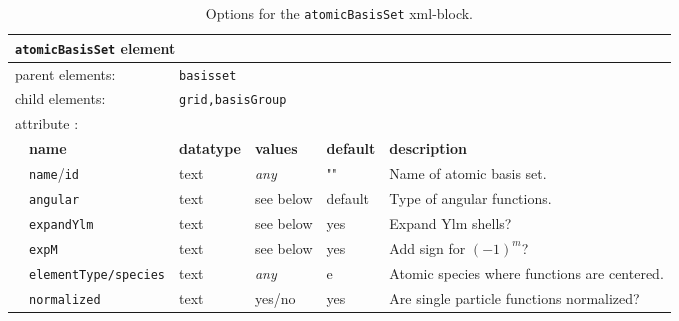 \begin{table}[h]
\begin{center}
\begin{tabularx}{\textwidth}{l l l l l X }
\hline
\multicolumn{6}{l}{\texttt{atomicBasisSet} element} \\
\hline
\multicolumn{2}{l}{parent elements:} & \multicolumn{4}{l}{\texttt{basisset}}\\
\multicolumn{2}{l}{child  elements:} & \multicolumn{4}{l}{\texttt{grid,basisGroup}}\\
\multicolumn{2}{l}{attribute      :} & \multicolumn{4}{l}{}\\
   &   \bfseries name              & \bfseries datatype & \bfseries values & \bfseries default   & \bfseries description \\
   &   \texttt{name}/\texttt{id}   &  text              &  \textit{any}    &  ""                & Name of atomic basis set. \\
   &   \texttt{angular}               &  text              &  see below    &  default       & Type of angular functions.  \\
   &   \texttt{expandYlm}         &  text              &  see below   &  yes                &  Expand Ylm shells? \\  
   &   \texttt{expM}                  &  text              &  see below   &  yes                &  Add sign for $(-1)^{m}$? \\  
   &   \texttt{elementType/species}   &  text  &  \textit{any}    &  e                &  Atomic species where functions are centered. \\
   &   \texttt{normalized}         &  text              &  yes/no   &  yes                &  Are single particle functions normalized? \\   
  \hline
\end{tabularx}
\end{center}
\caption{Options for the \texttt{atomicBasisSet} xml-block.}
\label{table:atomicBasisSet}
\end{table}

